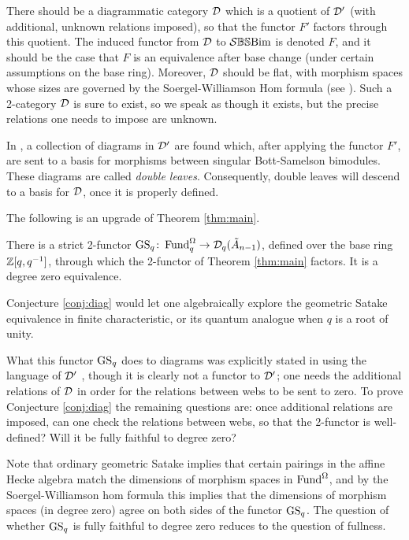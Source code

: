 {There should be a diagrammatic category $\mathcal{D}$ which is a quotient of $\mathcal{D}'$ (with additional, unknown relations imposed), so that the functor $F'$ factors through this quotient. The induced functor from $\mathcal{D}$ to $\mathcal{S}\mathbb{BS}\text{Bim}$ is denoted $F$, and it should be the case that $F$ is an equivalence after base change (under certain assumptions on the base ring). Moreover, $\mathcal{D}$ should be flat, with morphism spaces whose sizes are governed by the Soergel-Williamson Hom formula (see ). Such a 2-category $\mathcal{D}$ is sure to exist, so we speak as though it exists, but the precise relations one needs to impose are unknown.

In \cite{EKLP}, a collection of diagrams in $\mathcal{D}'$ are found which, after applying the functor $F'$, are sent to a basis for morphisms between singular Bott-Samelson bimodules. These diagrams are called \emph{double leaves}. Consequently, double leaves will descend to a basis for $\mathcal{D}$, once it is properly defined.

The following is an upgrade of Theorem \ref{thm:main}.

\begin{conjecture} \label{conj:diag} There is a strict 2-functor $\operatorname{GS}_q \colon \operatorname{Fund}_{q}^{\Omega} \to \mathcal{D}_{q}(\tilde{A}_{n-1})$, defined over the base ring $\mathbb{Z}[q,q^{-1}]$, through which the 2-functor of Theorem \ref{thm:main} factors. It is a degree zero equivalence. \end{conjecture}

Conjecture \ref{conj:diag} would let one algebraically explore the geometric Satake equivalence in finite characteristic, or its quantum analogue when $q$ is a root of unity.

What this functor $\operatorname{GS}_q$ does to diagrams was explicitly stated in \cite{EQuantumI} using the language of $\mathcal{D}'$ , though it is clearly not a functor to $\mathcal{D}'$; one needs the additional relations of $\mathcal{D}$ in order for the relations between webs to be sent to zero. To prove Conjecture \ref{conj:diag} the remaining questions are: once additional relations are imposed, can one check the relations between webs, so that the 2-functor is well-defined? Will it be fully faithful to degree zero?

Note that ordinary geometric Satake implies that certain pairings in the affine Hecke algebra match the dimensions of morphism spaces in $\operatorname{Fund}^{\Omega}$, and by the Soergel-Williamson hom formula this implies that the dimensions of morphism spaces (in degree zero) agree on both sides of the functor $\operatorname{GS}_q$. 
The question of whether $\operatorname{GS}_q$ is fully faithful to degree zero reduces to the question of fullness. 


}

